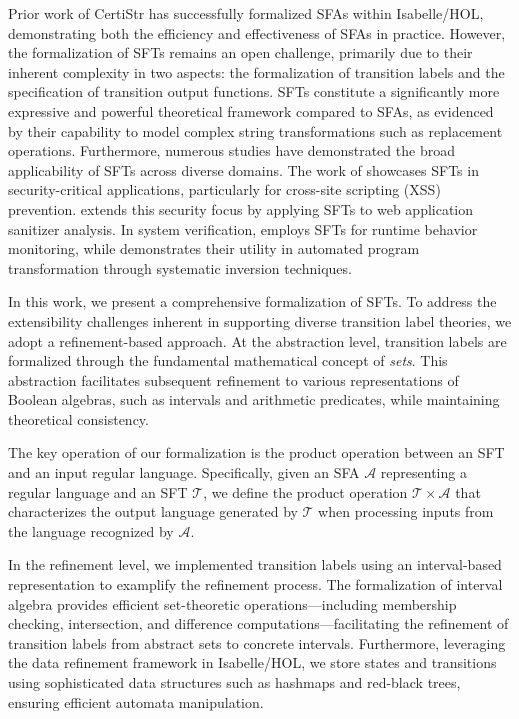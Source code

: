 \documentclass[sigplan,10pt,anonymous,review]{acmart}\settopmatter{printfolios=true,printccs=false,printacmref=false}
\begin{document}
Prior work of CertiStr \cite{cpp/KanLRS22} has successfully formalized SFAs within Isabelle/HOL, demonstrating both the efficiency and effectiveness of SFAs in practice. However, the formalization of SFTs remains an open challenge, primarily due to their inherent complexity in two aspects: the formalization of transition labels and the specification of transition output functions. SFTs constitute a significantly more expressive and powerful theoretical framework compared to  SFAs, as evidenced by their capability to model complex string transformations such as replacement operations.
%
Furthermore, numerous studies have demonstrated the broad applicability of SFTs across diverse domains. The work of \cite{VeanesHLMB12Transducer} showcases SFTs in security-critical applications, particularly for cross-site scripting (XSS) prevention. \cite{uss/HooimeijerLMSV11} extends this security focus by applying SFTs to web application sanitizer analysis. In system verification, \cite{osdi/YaseenABCL20} employs SFTs for runtime behavior monitoring, while \cite{pldi/HuD17} demonstrates their utility in automated program transformation through systematic inversion techniques.



 
In this work, we present a comprehensive formalization of SFTs. To address the extensibility challenges inherent in supporting diverse transition label theories, we adopt a refinement-based approach. At the abstraction level, transition labels are formalized through the fundamental mathematical concept of \emph{sets}. This abstraction facilitates subsequent refinement to various representations of Boolean algebras, such as intervals and arithmetic predicates, while maintaining theoretical consistency.

The key operation of our formalization is the product operation between an SFT and an input regular language. Specifically, given an SFA $\mathcal{A}$ representing a regular language and an SFT $\mathcal{T}$, we define the product operation $\mathcal{T} \times\mathcal{A}$ that characterizes the output language generated by $\mathcal{T}$ when processing inputs from the language recognized by $\mathcal{A}$.


In the refinement level, we implemented transition labels using an interval-based representation to examplify the refinement process. The formalization of interval algebra provides efficient set-theoretic operations—including membership checking, intersection, and difference computations—facilitating the refinement of transition labels from abstract sets to concrete intervals. Furthermore, leveraging the data refinement framework \cite{DBLP:conf/itp/Lammich13} in Isabelle/HOL, we store states and transitions using sophisticated data structures such as hashmaps and red-black trees, ensuring efficient automata manipulation.
\end{document}
